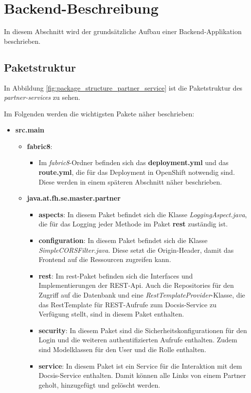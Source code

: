 \section{Backend-Beschreibung}
In diesem Abschnitt wird der grundsätzliche Aufbau einer Backend-Applikation beschrieben.

\subsection{Paketstruktur}
In Abbildung \ref{fig:package_structure_partner_service} ist die Paketstruktur des \textit{partner-services} zu sehen.

Im Folgenden werden die wichtigsten Pakete näher beschrieben:
\begin{itemize}
	\item \textbf{src.main}
	\begin{itemize}
		\item \textbf{fabric8}:
		\begin{itemize}
			\item  Im \textit{fabric8}-Ordner befinden sich das \textbf{deployment.yml} und das \textbf{route.yml}, die für das Deployment in OpenShift notwendig sind. Diese werden in einem späteren Abschnitt näher beschrieben.
		\end{itemize}
		\item \textbf{java.at.fh.se.master.partner}
		\begin{itemize}
			\item \textbf{aspects}: In diesem Paket befindet sich die Klasse \textit{LoggingAspect.java}, die für das Logging jeder Methode im Paket \textbf{rest} zuständig ist.
			\item \textbf{configuration}: In diesem Paket befindet sich die Klasse \textit{SimpleCORSFilter.java}. Diese setzt die Origin-Header, damit das Frontend auf die Ressourcen zugreifen kann.
			\item \textbf{rest}: Im rest-Paket befinden sich die Interfaces und Implementierungen der REST-Api. Auch die Repositories für den Zugriff auf die Datenbank und eine \textit{RestTemplateProvider}-Klasse, die das RestTemplate für REST-Aufrufe zum Docsis-Service zu Verfügung stellt, sind in diesem Paket enthalten. 
			\item \textbf{security}: In diesem Paket sind die Sicherheitskonfigurationen für den Login und die weiteren authentifizierten Aufrufe enthalten. Zudem sind Modelklassen für den User und die Rolle enthalten.
			\item \textbf{service}: In diesem Paket ist ein Service für die Interaktion mit dem Docsis-Service enthalten. Damit können alle Links von einem Partner geholt, hinzugefügt und gelöscht werden.

\end{itemize}
\end{itemize}
\end{itemize}
